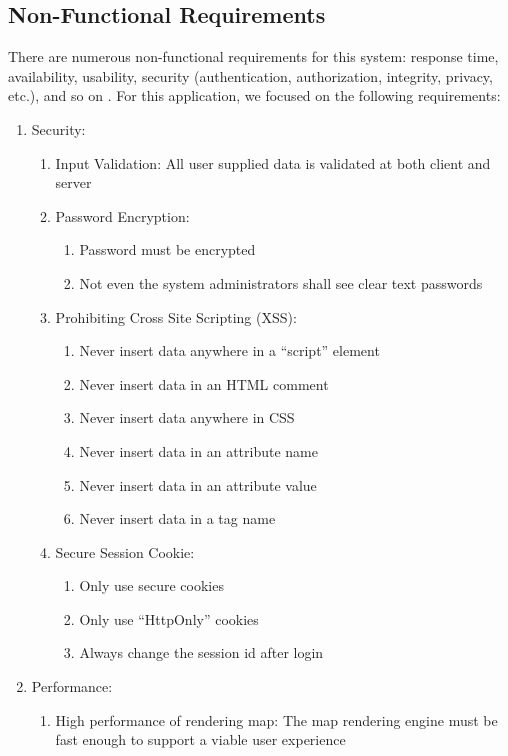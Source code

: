 \subsection{Non-Functional Requirements}
\label{sec:Requirements>Non-Functional Requirements}
There are numerous non-functional requirements for this system: response time, availability, usability, security (authentication, authorization, integrity, privacy, etc.), and so on \cite{web:NonFunc}. For this application, we focused on the following requirements:
\begin{enumerate}
  \item Security:
  \begin{enumerate}
    \item Input Validation: All user supplied data is validated at both client and server

    \item Password Encryption:
    \begin{enumerate}
      \item Password must be encrypted
      \item Not even the system administrators shall see clear text passwords
    \end{enumerate}

    \item Prohibiting Cross Site Scripting (XSS):
    \begin{enumerate}
      \item Never insert data anywhere in a ``script'' element
      \item Never insert data in an HTML comment
      \item Never insert data anywhere in CSS
      \item Never insert data in an attribute name
      \item Never insert data in an attribute value
      \item Never insert data in a tag name
    \end{enumerate}

    \item Secure Session Cookie:
    \begin{enumerate}
      \item Only use secure cookies
      \item Only use ``HttpOnly'' cookies
      \item Always change the session id after login
    \end{enumerate}
  \end{enumerate}

  \item Performance:
  \begin{enumerate}
    \item High performance of rendering map: The map rendering engine must be fast enough to support a viable user experience
  \end{enumerate}
\end{enumerate}

